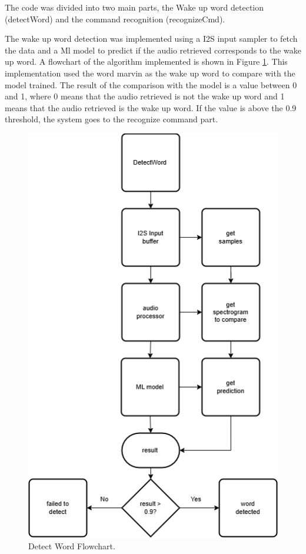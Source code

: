 The code was divided into two main parts, the Wake up word detection (detectWord) and the command recognition (recognizeCmd). 


The wake up word detection was implemented using a I2S input sampler to fetch the data and a Ml model to predict if the audio retrieved corresponds to the wake up word. A flowchart of the algorithm implemented is shown in Figure \ref{fig:detectWord}. This implementation used the word marvin as the wake up word to compare with the model trained. The result of the comparison with the model is a value between 0 and 1, where 0 means that the audio retrieved is not the wake up word and 1 means that the audio retrieved is the wake up word. If the value is above the 0.9 threshold, the system goes to the recognize command part.


\begin{figure}[H]
    \centering
    \includegraphics*[scale = 0.6]{Images/detectWord.png}
    \caption{Detect Word Flowchart.}
    \label{fig:detectWord}
\end{figure}

